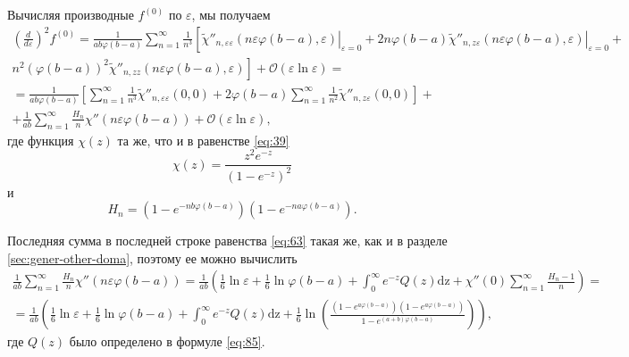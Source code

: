 \documentclass{article}
\newcommand{\dz}{\mathrm{dz}}
\begin{document}
Вычисляя производные  $f^{(0)}$ по $\varepsilon$, мы получаем
\begin{multline}
  \label{eq:63}
  \left(\frac{d}{d\varepsilon}\right)^{2} f^{(0)}=\frac{1}{ab\varphi(b-a)} \sum_{n=1}^{\infty}
  \frac{1}{n^{3}}\left[
    \left.\tilde{\chi}''_{n,\varepsilon\varepsilon}\left(n\varepsilon\varphi(b-a),\varepsilon\right)\right|_{\varepsilon=0}+
    2n\varphi(b-a)\left.\tilde{\chi}''_{n,z\varepsilon}\left(n\varepsilon\varphi(b-a),\varepsilon\right)\right|_{\varepsilon=0}+\right.\\\left.
      n^{2}\left(\varphi(b-a)\right)^{2}\tilde{\chi}''_{n,zz}\left(n\varepsilon\varphi(b-a),\varepsilon\right)  \right]+
    \mathcal{O}(\varepsilon \ln \varepsilon)=\\
    =\frac{1}{ab\varphi(b-a)}\left[\sum_{n=1}^{\infty} \frac{1}{n^{3}}
      \tilde{\chi}''_{n,\varepsilon\varepsilon}(0,0)+2\varphi(b-a)\sum_{n=1}^{\infty}\frac{1}{n^{2}}\tilde{\chi}''_{n,z\varepsilon}(0,0)\right]+
    \\
    +\frac{1}{ab}\sum_{n=1}^{\infty}\frac{H_{n}}{n}\chi''\left(n\varepsilon\varphi(b-a)\right)+\mathcal{O}(\varepsilon\ln \varepsilon),
\end{multline}
где функция  $\chi(z)$ та же, что и в равенстве \eqref{eq:39}
\begin{equation}
  \label{eq:64}
  \chi(z)=\frac{z^{2} e^{-z}}{\left(1-e^{-z}\right)^{2}}
\end{equation}
и
\begin{equation}
  \label{eq:65}
  H_{n}=\left(1-e^{-nb\varphi(b-a)}\right) \left(1-e^{-na\varphi(b-a)}\right).
\end{equation}

Последняя сумма в последней строке равенства \eqref{eq:63} такая же, как и в разделе
\ref{sec:gener-other-doma}, поэтому ее можно вычислить
\begin{multline}
  \label{eq:66}
  \frac{1}{ab}\sum_{n=1}^{\infty}\frac{H_{n}}{n}\chi''\left(n\varepsilon \varphi(b-a)\right)=
  \frac{1}{ab}\left(\frac{1}{6}\ln \varepsilon +\frac{1}{6}\ln \varphi(b-a)+ \int_{0}^{\infty}
    e^{-z}Q(z) \dz+\chi''(0)\sum_{n=1}^{\infty}\frac{H_{n}-1}{n}\right)=\\
  =\frac{1}{ab}\left(\frac{1}{6}\ln \varepsilon +\frac{1}{6}\ln \varphi(b-a)+ \int_{0}^{\infty}
    e^{-z}Q(z) \dz+\frac{1}{6}\ln\left(\frac{\left(1-e^{a\varphi(b-a)}\right)\left(1-e^{a\varphi(b-a)}\right)}{1-e^{(a+b)\varphi(b-a)}}\right)\right),
\end{multline}
где $Q(z)$ было определено в формуле \eqref{eq:85}.
\end{document}
